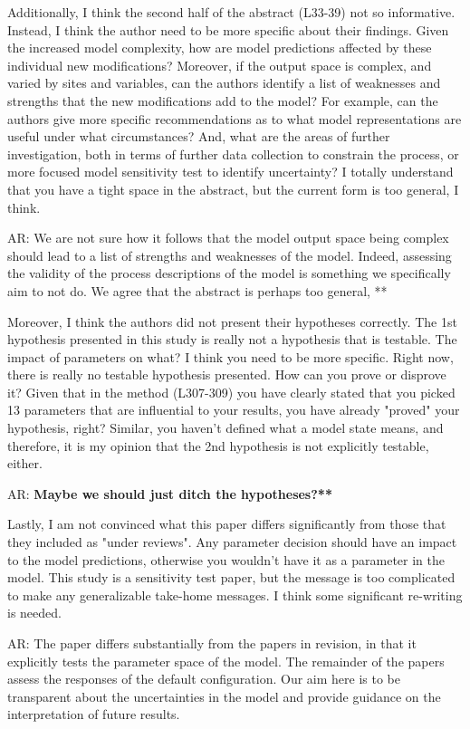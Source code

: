 \documentclass{article}
\begin{document}
{{Additionally, I think the second half of the abstract (L33-39) not so informative. Instead, I think the author need to be more specific about their findings. Given the increased model complexity, how are model predictions affected by these individual new modifications? Moreover, if the output space is complex, and varied by sites and variables, can the authors identify a list of weaknesses and strengths that the new modifications add to the model? For example, can the authors give more specific recommendations as to what model representations are useful under what circumstances? And, what are the areas of further investigation, both in terms of further data collection to constrain the process, or more focused model sensitivity test to identify uncertainty? I totally understand that you have a tight space in the abstract, but the current form is too general, I think. 

\textsf{AR: We are not sure how it follows that the model output space being complex should lead to a list of strengths and weaknesses of the model. Indeed, assessing the validity of the process descriptions of the model is something we specifically aim to not do. We agree that the abstract is perhaps too general, **}}

Moreover, I think the authors did not present their hypotheses correctly. The 1st hypothesis presented in this study is really not a hypothesis that is testable. The impact of parameters on what? I think you need to be more specific. Right now, there is really no testable hypothesis presented. How can you prove or disprove it? Given that in the method (L307-309) you have clearly stated that you picked 13 parameters that are influential to your results, you have already "proved" your hypothesis, right? Similar, you haven't defined what a model state means, and therefore, it is my opinion that the 2nd hypothesis is not explicitly testable, either. 

\textsf{AR: \textbf{Maybe we should just ditch the hypotheses?** }}

Lastly, I am not convinced what this paper differs significantly from those that they included as "under reviews". Any parameter decision should have an impact to the model predictions, otherwise you wouldn't have it as a parameter in the model. This study is a sensitivity test paper, but the message is too complicated to make any generalizable take-home messages. I think some significant re-writing is needed. 

\textsf{AR: The paper differs substantially from the papers in revision, in that it explicitly tests the parameter space of the model.  The remainder of the papers assess the responses of the default configuration. Our aim here is to be transparent about the uncertainties in the model and provide guidance on the interpretation of future results.} 

}
\end{document}
